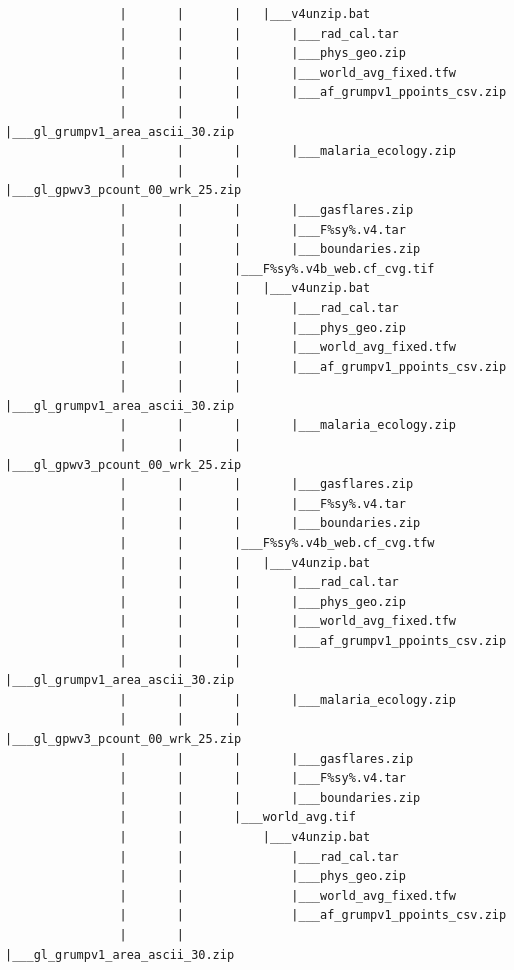 \documentclass[]{book}
\begin{document}
\begin{verbatim}
                |       |       |   |___v4unzip.bat
                |       |       |       |___rad_cal.tar
                |       |       |       |___phys_geo.zip
                |       |       |       |___world_avg_fixed.tfw
                |       |       |       |___af_grumpv1_ppoints_csv.zip
                |       |       |       |___gl_grumpv1_area_ascii_30.zip
                |       |       |       |___malaria_ecology.zip
                |       |       |       |___gl_gpwv3_pcount_00_wrk_25.zip
                |       |       |       |___gasflares.zip
                |       |       |       |___F%sy%.v4.tar
                |       |       |       |___boundaries.zip
                |       |       |___F%sy%.v4b_web.cf_cvg.tif
                |       |       |   |___v4unzip.bat
                |       |       |       |___rad_cal.tar
                |       |       |       |___phys_geo.zip
                |       |       |       |___world_avg_fixed.tfw
                |       |       |       |___af_grumpv1_ppoints_csv.zip
                |       |       |       |___gl_grumpv1_area_ascii_30.zip
                |       |       |       |___malaria_ecology.zip
                |       |       |       |___gl_gpwv3_pcount_00_wrk_25.zip
                |       |       |       |___gasflares.zip
                |       |       |       |___F%sy%.v4.tar
                |       |       |       |___boundaries.zip
                |       |       |___F%sy%.v4b_web.cf_cvg.tfw
                |       |       |   |___v4unzip.bat
                |       |       |       |___rad_cal.tar
                |       |       |       |___phys_geo.zip
                |       |       |       |___world_avg_fixed.tfw
                |       |       |       |___af_grumpv1_ppoints_csv.zip
                |       |       |       |___gl_grumpv1_area_ascii_30.zip
                |       |       |       |___malaria_ecology.zip
                |       |       |       |___gl_gpwv3_pcount_00_wrk_25.zip
                |       |       |       |___gasflares.zip
                |       |       |       |___F%sy%.v4.tar
                |       |       |       |___boundaries.zip
                |       |       |___world_avg.tif
                |       |           |___v4unzip.bat
                |       |               |___rad_cal.tar
                |       |               |___phys_geo.zip
                |       |               |___world_avg_fixed.tfw
                |       |               |___af_grumpv1_ppoints_csv.zip
                |       |               |___gl_grumpv1_area_ascii_30.zip

\end{verbatim}
\end{document}
